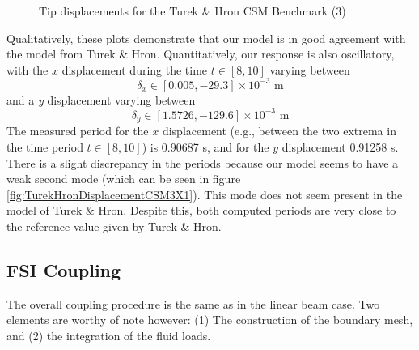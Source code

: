 \documentclass{article}
\begin{document}
\begin{enumerate}
\begin{figure}[ht]
        \centering
        \caption{Tip displacements for the Turek \& Hron CSM Benchmark (3)}
\end{figure}
\end{enumerate}
Qualitatively, these plots demonstrate that our model is in good agreement with the model from Turek \& Hron.  
Quantitatively, our response is also oscillatory, with the $x$ displacement during the time $t\in[8,10]$ varying between
\[ \delta_x \in [0.005,-29.3] \times 10^{-3} \mbox{ m} \]
and a \emph{y} displacement varying between
\[ \delta_y \in [1.5726,-129.6] \times 10^{-3} \mbox{ m} \]
The measured period for the $x$ displacement (e.g., between the two extrema in the time period $t\in[8,10]$) is 0.90687 s, and for the $y$ displacement 0.91258 s. 
There is a slight discrepancy in the periods because our model seems to have a weak second mode (which can be seen in figure \ref{fig:TurekHronDisplacementCSM3X1}).
This mode does not seem present in the model of Turek \& Hron.
Despite this, both computed periods are very close to the reference value given by Turek \& Hron.

\subsection{FSI Coupling}
The overall coupling procedure is the same as in the linear beam case.  
Two elements are worthy of note however: (1) The construction of the boundary mesh, and (2) the integration of the fluid loads.
\end{document}
